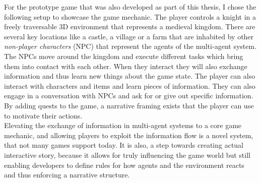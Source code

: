 For the prototype game that was also developed as part of this thesis, I chose the following setup to showcase the game mechanic. The player controls a knight in a freely traversable 3D environment that represents a medieval kingdom. There are several key locations like a castle, a village or a farm that are inhabited by other \textit{non-player characters} (NPC) that represent the agents of the multi-agent system. The NPCs move around the kingdom and execute different tasks which bring them into contact with each other. When they interact they will also exchange information and thus learn new things about the game state. The player can also interact with characters and items and learn pieces of information. They can also engage in a conversation with NPCs and ask for or give out specific information. By adding quests to the game, a narrative framing exists that the player can use to motivate their actions.\\
Elevating the exchange of information in multi-agent systems to a core game mechanic, and allowing players to exploit the information flow is a novel system, that not many games support today. It is also, a step towards creating actual interactive story, because it allows for truly influencing the game world but still enabling developers to define rules for how agents and the environment reacts and thus enforcing a narrative structure.